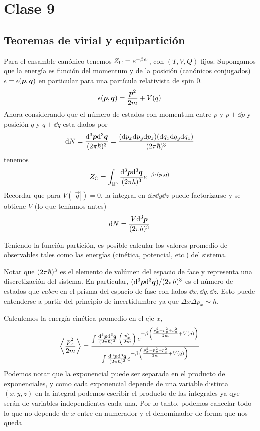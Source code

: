 \section{Clase 9}
\subsection{Teoremas de virial y equipartición}
Para el ensamble canónico tenemos $Z_{\rm C}=e^{-\beta \epsilon_i}$, con $(T,V,Q)$ fijos. Supongamos que la energía es función del momentum y de la posición (canónicos conjugados) $\epsilon=\epsilon(\vb*{p},\vb*{q})$ en particular para una partícula relativista de spin $0$.
\begin{equation}
  \epsilon(\vb*{p},\vb*{q})=\frac{\vb*{p}^2}{2m}+V(q)
\end{equation}
Ahora considerando que el número de estados con momentum entre $p$ y $p+\dd p$ y posición $q$ y $q+\dd q$ esta dados por
\begin{equation}
  \dd N=\frac{\dd^3\vb*{p}\dd^3\vb*{q}}{(2\pi\hbar)^3}=\frac{(\dd p_x\dd p_y\dd p_z)(\dd q_x\dd q_y\dd q_z)}{(2\pi\hbar)^3}
\end{equation}
tenemos
\begin{equation}
  Z_{\rm C}=\int_{\mathbb{R}^6}\frac{\dd^3\vb*{p}\dd^3\vb*{q}}{(2\pi\hbar)^3}e^{-\beta\epsilon(\vb*{p},\vb*{q})}
\end{equation}
Recordar que para $V(|\vec{q}|)=0$, la integral en $\dd x\dd y\dd z$ puede factorizarse y se obtiene $V$ (lo que teníamos antes)
\begin{equation}
  \dd N=\frac{V\dd^3\vb*{p}}{(2\pi\hbar)^3}
\end{equation}

Teniendo la función partición, es posible calcular los valores promedio de observables tales como las energías (cinética, potencial, etc.) del sistema.

Notar que $(2\pi\hbar)^3$ es el elemento de volúmen del espacio de face y representa una discretización del sistema. En particular, $(\dd^3\vb*{p}\dd^3\vb*{q})/(2\pi\hbar)^3$ es el número de estados que \textit{caben} en el prisma del espacio de fase con lados $\dd x,\dd y,\dd z$. Esto puede entenderse a partir del principio de incertidumbre ya que $\Delta x\Delta p_x\sim h$.

Calculemos la energía cinética promedio en el eje $x$,
\begin{equation}
  \ev{\frac{p_x^2}{2m}}=\frac{\intpq\left(\frac{p_x^2}{2m}\right)e^{-\b\left(\frac{p_x^2+p_y^2+p_z^2}{2m}+V(q)\right)}}{\intpq e^{-\b\left(\frac{p_x^2+p_y^2+p_z^2}{2m}+V(q)\right)}}
\end{equation}
Podemos notar que la exponencial puede ser separada en el producto de exponenciales, y como cada exponencial depende de una variable distinta $(x,y,z)$ en la integral podemos escribir el producto de las integrales ya qye serán de variables independientes cada una. Por lo tanto, podemos cancelar todo lo que no depende de $x$ entre en numerador y el denominador de forma que nos queda


